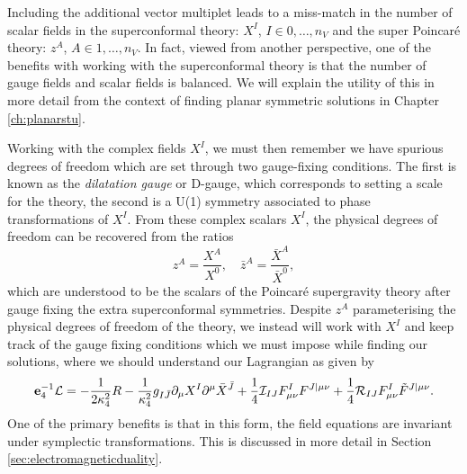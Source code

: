 Including the additional vector multiplet leads to a miss-match in the number of scalar fields in the superconformal theory: $X^I$, $I \in {0,\ldots,n_V}$ and the super Poincar\'e theory: $z^A$, $A \in {1,\ldots,n_V}$. In fact, viewed from another perspective, one of the benefits with working with the superconformal theory is that the number of gauge fields and scalar fields is balanced. We will explain the utility of this in more detail from the context of finding planar symmetric solutions in Chapter \ref{ch:planarstu}.

Working with the complex fields $X^I$, we must then remember we have spurious degrees of freedom which are set through two gauge-fixing conditions. The first is known as the \emph{dilatation gauge} or D-gauge, which corresponds to setting a scale for the theory, the second is a U(1) symmetry associated to phase transformations of $X^I$. From these complex scalars $X^I$, the physical degrees of freedom can be recovered from the ratios
\begin{equation*}
	z^A = \frac{X^A}{X^0}, \quad \bar{z}^A = \frac{\bar{X}^A}{\bar{X}^0},
\end{equation*}
which are understood to be the scalars of the Poincar\'e supergravity theory after gauge fixing the extra superconformal symmetries. Despite $z^A$ parameterising the physical degrees of freedom of the theory, we instead will work with $X^I$ and keep track of the gauge fixing conditions which we must impose while finding our solutions, where we should understand our Lagrangian as given by
\begin{equation*}
\mathbf{e}_4^{-1} {\cal L} = - \frac{1}{2\kappa_4^2}R - \frac{1}{\kappa_4^2}g_{I\bar{J}} \partial_\mu X^I \partial^\mu \bar{X}^{\bar{J}} + \frac{1}{4} {\cal I}_{IJ} F^I_{\mu \nu} F^{J|\mu \nu} + \frac{1}{4} {\cal R}_{IJ} F^I_{\mu \nu} \tilde{F}^{J|\mu \nu}.
\end{equation*}
One of the primary benefits is that in this form, the field equations are invariant under symplectic transformations. This is discussed in more detail in Section \ref{sec:electromagneticduality}.

